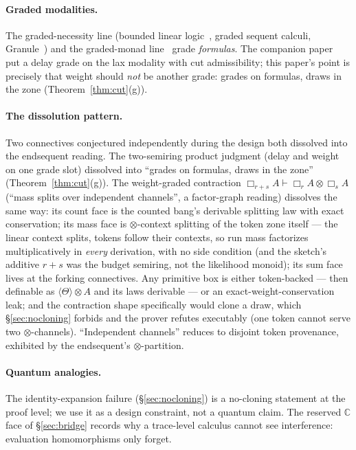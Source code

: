 \documentclass[11pt]{article}
\newcommand{\CC}{\mathbb{C}}                     %
\theoremstyle{definition}
\theoremstyle{remark}
\begin{document}
\paragraph{Graded modalities.}  The graded-necessity line
(bounded linear logic~\cite{GirardScedrovScott1992}, graded
sequent calculi, Granule~\cite{OrchardLiepeltEades2019}) and the
graded-monad line~\cite{Katsumata2014} grade \emph{formulas}.  The
companion paper~\cite{TillPaper} put a delay grade on the lax modality
with cut admissibility; this paper's point is precisely that weight
should \emph{not} be another grade: grades on formulas, draws in the
zone (Theorem~\ref{thm:cut}(g)).

\paragraph{The dissolution pattern.}  Two connectives conjectured
independently during the design both dissolved into the endsequent
reading.  The two-semiring product judgment (delay and weight on one
grade slot) dissolved into ``grades on formulas, draws in the zone''
(Theorem~\ref{thm:cut}(g)).  The weight-graded contraction
$\Box_{r+s}A \vdash \Box_r A \otimes \Box_s A$ (``mass splits over
independent channels'', a factor-graph reading) dissolves the same
way: its count face is the counted bang's derivable splitting law with
exact conservation; its mass face is $\otimes$-context splitting of
the token zone itself --- the linear context splits, tokens follow
their contexts, so run mass factorizes multiplicatively in
\emph{every} derivation, with no side condition (and the sketch's
additive $r{+}s$ was the budget semiring, not the likelihood monoid);
its sum face lives at the forking connectives.  Any primitive box is
either token-backed --- then definable as
$\langle\Theta\rangle \otimes A$ and its laws derivable --- or an
exact-weight-conservation leak; and the contraction shape specifically
would clone a draw, which \S\ref{sec:nocloning} forbids and the
prover refutes executably (one token cannot serve two
$\otimes$-channels).  ``Independent channels'' reduces to disjoint
token provenance, exhibited by the endsequent's $\otimes$-partition.

\paragraph{Quantum analogies.}  The identity-expansion failure
(\S\ref{sec:nocloning}) is a no-cloning statement at the proof level;
we use it as a design constraint, not a quantum claim.  The reserved
$\CC$ face of \S\ref{sec:bridge} records why a trace-level calculus
cannot see interference: evaluation homomorphisms only forget.
\end{document}
